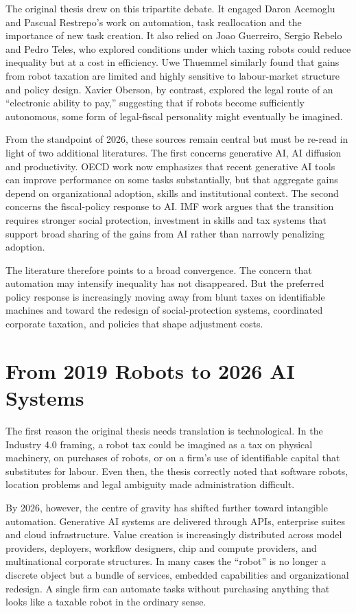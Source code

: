\documentclass[11pt]{article}
\begin{document}
The original thesis drew on this tripartite debate. It engaged Daron Acemoglu and Pascual Restrepo's work on automation, task reallocation and the importance of new task creation. It also relied on Joao Guerreiro, Sergio Rebelo and Pedro Teles, who explored conditions under which taxing robots could reduce inequality but at a cost in efficiency. Uwe Thuemmel similarly found that gains from robot taxation are limited and highly sensitive to labour-market structure and policy design. Xavier Oberson, by contrast, explored the legal route of an ``electronic ability to pay,'' suggesting that if robots become sufficiently autonomous, some form of legal-fiscal personality might eventually be imagined.

From the standpoint of 2026, these sources remain central but must be re-read in light of two additional literatures. The first concerns generative AI, AI diffusion and productivity. OECD work now emphasizes that recent generative AI tools can improve performance on some tasks substantially, but that aggregate gains depend on organizational adoption, skills and institutional context. The second concerns the fiscal-policy response to AI. IMF work argues that the transition requires stronger social protection, investment in skills and tax systems that support broad sharing of the gains from AI rather than narrowly penalizing adoption.

The literature therefore points to a broad convergence. The concern that automation may intensify inequality has not disappeared. But the preferred policy response is increasingly moving away from blunt taxes on identifiable machines and toward the redesign of social-protection systems, coordinated corporate taxation, and policies that shape adjustment costs.

\section{From 2019 Robots to 2026 AI Systems}
The first reason the original thesis needs translation is technological. In the Industry 4.0 framing, a robot tax could be imagined as a tax on physical machinery, on purchases of robots, or on a firm's use of identifiable capital that substitutes for labour. Even then, the thesis correctly noted that software robots, location problems and legal ambiguity made administration difficult.

By 2026, however, the centre of gravity has shifted further toward intangible automation. Generative AI systems are delivered through APIs, enterprise suites and cloud infrastructure. Value creation is increasingly distributed across model providers, deployers, workflow designers, chip and compute providers, and multinational corporate structures. In many cases the ``robot'' is no longer a discrete object but a bundle of services, embedded capabilities and organizational redesign. A single firm can automate tasks without purchasing anything that looks like a taxable robot in the ordinary sense.
\end{document}
